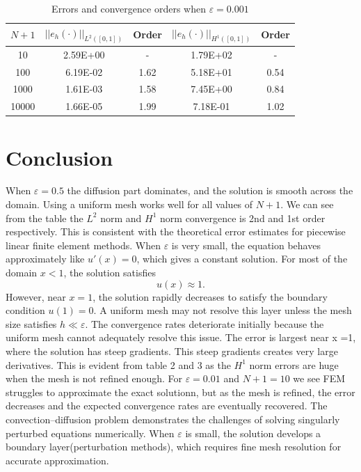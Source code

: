 \documentclass[11pt]{article}      %
\begin{document}
\begin{enumerate}
\begin{table}[!h]
	\caption{Errors and convergence orders when $\varepsilon = 0.001$}
	\vspace{0.1in}
	\centering
	\begin{tabular}{|c|c|c|c|c|}
		\hline
		$N+1$ & $||e_h(\cdot)||_{L^2([0,1])}$ & Order & $||e_h(\cdot)||_{H^1([0,1])}$ & Order \\
		\hline
		10    & 2.59E+00 & -    & 1.79E+02 & - \\
		100   & 6.19E-02 & 1.62 & 5.18E+01 & 0.54 \\
		1000  & 1.61E-03 & 1.58 & 7.45E+00 & 0.84 \\
		10000 & 1.66E-05 & 1.99 & 7.18E-01 & 1.02 \\
		\hline
	\end{tabular}
	\label{tab_eps0001}
\end{table}
\clearpage
\section{Conclusion}
When $\varepsilon = 0.5$ the diffusion part dominates, and the solution is smooth across the domain. Using a uniform mesh works well for all values of $N+1$. We can see from the table the $L^2$ norm and $H^1$ norm convergence is 2nd and 1st order respectively. This is consistent with the theoretical error estimates for piecewise linear finite element methods.   When $\varepsilon$ is very small, the equation behaves approximately like $u'(x) = 0$, which gives a constant solution. For most of the domain $x<1$, the solution satisfies
\[
u(x) \approx 1.
\]
However, near $x=1$, the solution rapidly decreases to satisfy the boundary
condition $u(1)=0$.  A uniform mesh may not
resolve this layer unless the mesh size satisfies $h \ll \varepsilon$. The convergence rates deteriorate initially
because the uniform mesh cannot adequately resolve this issue.  The error is largest near x =1, where the solution has steep gradients. This steep gradients creates very large derivatives. This is evident from table 2 and 3 as the $H^1$ norm errors are huge when the mesh is not refined enough. For $\varepsilon = 0.01$ and $N+1 = 10$ we see FEM struggles to approximate the exact solutionn, but 
as the mesh is refined, the error decreases and the expected convergence
rates are eventually recovered.
The convection--diffusion problem demonstrates the challenges of solving
singularly perturbed equations numerically. When $\varepsilon$ is small, the
solution develops a boundary layer(perturbation methods), which requires
fine mesh resolution for accurate approximation. 
\end{enumerate}
\end{document}
